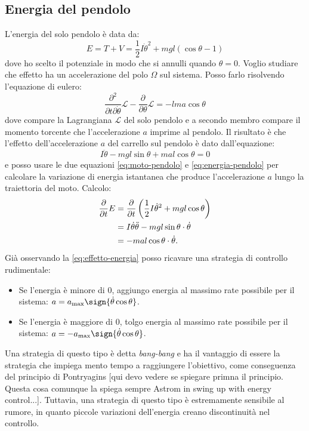 \subsection{Energia del pendolo}
L'energia del solo pendolo è data da:
\begin{equation}
    E = T + V = \frac 1 2 I \dot \theta^2 + mgl(\cos\theta-1)
    \label{eq:energia-pendolo}
\end{equation}
dove ho scelto il potenziale in modo che si annulli quando $\theta=0$. Voglio studiare che effetto ha un accelerazione del polo $\Omega$ sul sistema. Posso farlo risolvendo l'equazione di eulero:
\begin{equation*}
    \frac {\partial^2} {\partial t \partial \dot \theta} \mathcal L - \frac \partial {\partial \theta} \mathcal L = -l ma \cos \theta 
\end{equation*}
dove compare la Lagrangiana $\mathcal L$ del solo pendolo e a secondo membro compare il momento torcente che l'accelerazione $a$ imprime al pendolo. Il risultato è che l'effetto dell'accelerazione $a$ del carrello sul pendolo è dato dall'equazione:
\begin{equation}
    I \ddot \theta - mgl\sin \theta + mal \cos \theta = 0
    \label{eq:moto-pendolo}
\end{equation}
e posso usare le due equazioni \eqref{eq:moto-pendolo} e \eqref{eq:energia-pendolo} per calcolare la variazione di energia istantanea che produce l'accelerazione $a$ lungo la traiettoria del moto. Calcolo:
\begin{equation}
\begin{aligned}
    \frac \partial {\partial t} E 
    &= \frac \partial {\partial t} \left(\frac 1 2 I \dot \theta ^2 + mgl \cos \theta  \right) \\
    &= I \dot \theta \ddot \theta - mgl \sin \theta \cdot \dot \theta \\
    &= -mal \cos \theta \cdot \dot \theta
    .
    \label{eq:effetto-energia}
    \end{aligned}
\end{equation}
Già osservando la \eqref{eq:effetto-energia} posso ricavare una strategia di controllo rudimentale:
\begin{itemize}
    \item Se l'energia è minore di $0$, aggiungo energia al massimo rate possibile per il sistema: $a = a_{\text{max}}\sign{\dot \theta \cos \theta}$.
    \item Se l'energia è maggiore di $0$, tolgo energia al massimo rate possibile per il sistema: $a = -a_{\text{max}}\sign{\dot \theta \cos \theta}$.
\end{itemize}
Una strategia di questo tipo è detta \emph{bang-bang} e ha il vantaggio di essere la strategia che impiega mento tempo a raggiungere l'obiettivo, come conseguenza del principio di Pontryagins [qui devo vedere se spiegare primna il principio. Questa cosa comunque la spiega sempre Astrom in swing up with energy control...]. Tuttavia, una strategia di questo tipo è estremamente sensibile al rumore, in quanto piccole variazioni dell'energia creano discontinuità nel controllo.


